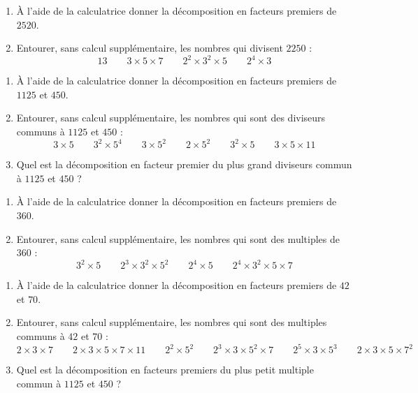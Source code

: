 \documentclass[main.tex]{subfiles}
\begin{document}
\begin{exercise}\hfill 
	\begin{enumerate}[label=\alph*), leftmargin=*]
		\item À l'aide de la calculatrice donner la décomposition en facteurs premiers de $2520$.
		\item Entourer, sans calcul supplémentaire, les nombres qui divisent $2250$ : 
		\setlength{\abovedisplayskip}{5pt}
		\setlength{\belowdisplayskip}{5pt}
		\[
		13 \qquad 3\times 5\times 7 \qquad 2^2\times 3^2\times 5 \qquad 2^4\times 3
		\]
	\end{enumerate}
\end{exercise}
\begin{exercise}\hfill 
	\begin{enumerate}[label=\alph*), leftmargin=*]
		\item À l'aide de la calculatrice donner la décomposition en facteurs premiers de $1125$ et $450$.
		\item Entourer, sans calcul supplémentaire, les nombres qui sont des diviseurs communs à $1125$ et $450$ : 
		\setlength{\abovedisplayskip}{5pt}
		\setlength{\belowdisplayskip}{5pt}
		\[
		3\times 5 \qquad 3^2\times 5^4 \qquad 3\times 5^2\qquad 2\times 5^2\qquad 3^2\times 5 \qquad 3\times 5 \times 11
		\]
		\item Quel est la décomposition en facteur premier du plus grand diviseurs commun à $1125$ et $450$ ?
	\end{enumerate}
\end{exercise} 
\begin{exercise}\hfill 
\begin{enumerate}[label=\alph*), leftmargin=*]
	\item À l'aide de la calculatrice donner la décomposition en facteurs premiers de $360$.
	\item Entourer, sans calcul supplémentaire, les nombres qui sont des multiples de $360$ : 
	\setlength{\abovedisplayskip}{5pt}
	\setlength{\belowdisplayskip}{5pt}
	\[
	3^2\times 5\qquad 2^3\times 3^2\times 5^2 \qquad 2^4\times 5 \qquad 2^4\times 3^2\times 5\times 7
	\]
\end{enumerate}
\end{exercise}
\begin{exercise}\hfill 
	\begin{enumerate}[label=\alph*), leftmargin=*]
		\item À l'aide de la calculatrice donner la décomposition en facteurs premiers de $42$ et $70$.
		\item Entourer, sans calcul supplémentaire, les nombres qui sont des multiples communs à $42$ et $70$ : 
		\setlength{\abovedisplayskip}{5pt}
		\setlength{\belowdisplayskip}{5pt}
		\[
		2\times 3\times 7 \qquad 2\times 3\times 5\times 7\times 11 \qquad 2^2\times 5^2\qquad 2^3\times 3\times 5^2\times 7 \qquad 2^5\times 3\times 5^3 \qquad 2\times 3\times 5\times 7^2
		\]
		\item Quel est la décomposition en facteurs premiers du plus petit multiple commun à $1125$ et $450$ ?
	\end{enumerate}
\end{exercise}
\end{document}
